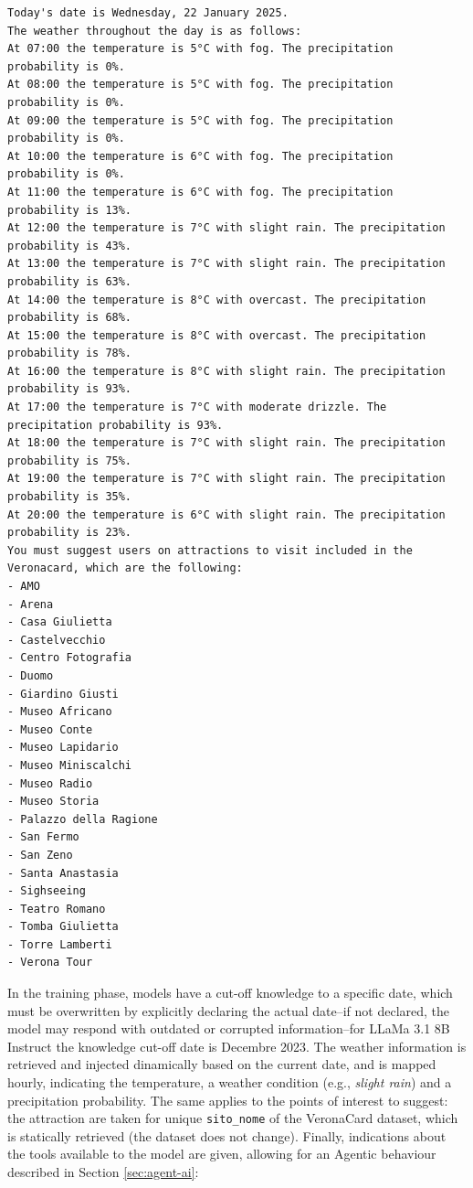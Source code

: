 \begin{Verbatim}[breaklines=true]
Today's date is Wednesday, 22 January 2025.
The weather throughout the day is as follows:
At 07:00 the temperature is 5°C with fog. The precipitation probability is 0%.
At 08:00 the temperature is 5°C with fog. The precipitation probability is 0%.
At 09:00 the temperature is 5°C with fog. The precipitation probability is 0%.
At 10:00 the temperature is 6°C with fog. The precipitation probability is 0%.
At 11:00 the temperature is 6°C with fog. The precipitation probability is 13%.
At 12:00 the temperature is 7°C with slight rain. The precipitation probability is 43%.
At 13:00 the temperature is 7°C with slight rain. The precipitation probability is 63%.
At 14:00 the temperature is 8°C with overcast. The precipitation probability is 68%.
At 15:00 the temperature is 8°C with overcast. The precipitation probability is 78%.
At 16:00 the temperature is 8°C with slight rain. The precipitation probability is 93%.
At 17:00 the temperature is 7°C with moderate drizzle. The precipitation probability is 93%.
At 18:00 the temperature is 7°C with slight rain. The precipitation probability is 75%.
At 19:00 the temperature is 7°C with slight rain. The precipitation probability is 35%.
At 20:00 the temperature is 6°C with slight rain. The precipitation probability is 23%.
You must suggest users on attractions to visit included in the Veronacard, which are the following: 
- AMO
- Arena
- Casa Giulietta
- Castelvecchio
- Centro Fotografia
- Duomo
- Giardino Giusti
- Museo Africano
- Museo Conte
- Museo Lapidario
- Museo Miniscalchi
- Museo Radio
- Museo Storia
- Palazzo della Ragione
- San Fermo
- San Zeno
- Santa Anastasia
- Sighseeing
- Teatro Romano
- Tomba Giulietta
- Torre Lamberti
- Verona Tour
\end{Verbatim}

In the training phase, models have a cut-off knowledge to a specific date, which must be overwritten by explicitly declaring the actual date--if not declared, the model may respond with outdated or corrupted information--for LLaMa 3.1 8B Instruct the knowledge cut-off date is Decembre 2023. The weather information is retrieved and injected dinamically based on the current date, and is mapped hourly, indicating the temperature, a weather condition (e.g., \textit{slight rain}) and a precipitation probability. The same applies to the points of interest to suggest: the attraction are taken for unique \texttt{sito\_nome} of the VeronaCard dataset, which is statically retrieved (the dataset does not change).
Finally, indications about the tools available to the model are given, allowing for an Agentic behaviour described in Section \ref{sec:agent-ai}:

